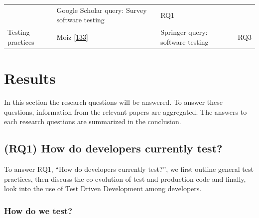 \documentclass[]{book}
\begin{document}
\begin{longtable}[]{@{}llll@{}}
\begin{minipage}[t]{0.16\columnwidth}
\end{minipage} & \begin{minipage}[t]{0.50\columnwidth}\raggedright\strut
Google Scholar query: Survey software testing\strut
\end{minipage} & \begin{minipage}[t]{0.04\columnwidth}\raggedright\strut
RQ1\strut
\end{minipage}\tabularnewline
\begin{minipage}[t]{0.18\columnwidth}\raggedright\strut
Testing practices\strut
\end{minipage} & \begin{minipage}[t]{0.16\columnwidth}\raggedright\strut
Moiz {[}\protect\hyperlink{ref-moiz2017uncertainty}{133}{]}\strut
\end{minipage} & \begin{minipage}[t]{0.50\columnwidth}\raggedright\strut
Springer query: software testing\strut
\end{minipage} & \begin{minipage}[t]{0.04\columnwidth}\raggedright\strut
RQ3\strut
\end{minipage}\tabularnewline
\bottomrule
\end{longtable}

\section{Results}\label{results}

In this section the research questions will be answered. To answer these
questions, information from the relevant papers are aggregated. The
answers to each research questions are summarized in the conclusion.

\subsection{(RQ1) How do developers currently
test?}\label{rq1-how-do-developers-currently-test}

To answer RQ1, ``How do developers currently test?'', we first outline
general test practices, then discuss the co-evolution of test and
production code and finally, look into the use of Test Driven
Development among developers.

\subsubsection{How do we test?}\label{how-do-we-test}
\end{document}
